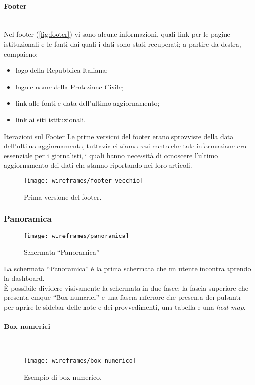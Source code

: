 \documentclass[../../../main.tex]{subfiles}
\begin{document}
\paragraph{Footer}\mbox{}\\
Nel footer (\ref{fig:footer}) vi sono alcune informazioni, quali link per le pagine istituzionali e le fonti dai quali i dati sono stati recuperati; a partire da destra, compaiono:
\begin{itemize}
    \item logo della Repubblica Italiana;
    \item logo e nome della Protezione Civile;
    \item link alle fonti e data dell'ultimo aggiornamento;
    \item link ai siti istituzionali.
\end{itemize}

\begin{bclogo}{Iterazioni sul Footer}
    Le prime versioni del footer erano sprovviste della data dell'ultimo aggiornamento, tuttavia ci siamo resi conto che tale informazione era essenziale per i giornalisti, i quali hanno necessità di conoscere l'ultimo aggiornamento dei dati che stanno riportando nei loro articoli.
\begin{figure}[H]
    \centering
    \texttt{[image: wireframes/footer-vecchio]}
    \caption{Prima versione del footer.}
    \label{fig:footer-vecchio}
\end{figure}
\end{bclogo}


\subsubsection{Panoramica}\label{ss:panoramica}
\begin{figure}[H]
    \centering
    \texttt{[image: wireframes/panoramica]}
    \caption{Schermata ``Panoramica''}
    \label{fig:panoramica}
\end{figure}
La schermata ``Panoramica'' è la prima schermata che un utente incontra aprendo la dashboard.\\
\`E possibile dividere visivamente la schermata in due fasce: la fascia superiore che presenta cinque ``Box numerici'' e una fascia inferiore che presenta dei pulsanti per aprire le sidebar delle note e dei provvedimenti, una tabella e una \textit{heat map}.\\

\paragraph{Box numerici}\mbox{}\\
\begin{figure}[H]
    \centering
    \texttt{[image: wireframes/box-numerico]}
    \caption{Esempio di box numerico.}
    \label{fig:box-numerico}
\end{figure}
\end{document}
